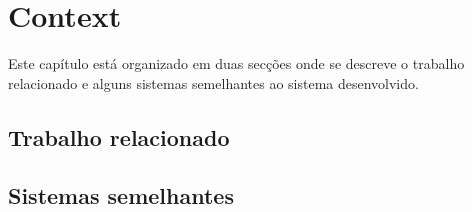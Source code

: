 \chapter{Context}\label{ch:context}

Este capítulo está organizado em duas secções onde se descreve o trabalho relacionado e alguns sistemas semelhantes ao sistema desenvolvido.


\section{Trabalho relacionado}
\lipsum[1-2]


\section{Sistemas semelhantes}
\lipsum[3-5]
